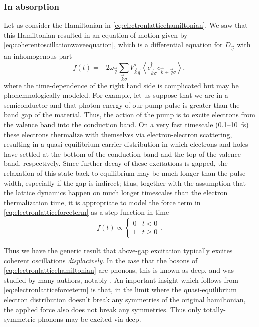 \subsubsection{In absorption}

Let us consider the Hamiltonian in \cref{eq:electronlatticehamiltonian}.
We saw that this Hamiltonian resulted in an equation of motion given by \cref{eq:coherentoscillationwaveequation}, which is a differential equation for $D_{\vec{q}}$ with an inhomogenous part
\begin{equation}\label{eq:electronlatticeforceterm}
f(t) = -2\omega_{\vec{q}}\sum_{\vec{k}\sigma}V^\sigma_{\vec{k}\vec{q}}\left<c^\dagger_{\vec{k}\sigma} c_{\vec{k}+\vec{q}\sigma}\right>,
\end{equation}
where the time-dependence of the right hand side is complicated but may be phonemnologically modeled.
For example, let us suppose that we are in a semiconductor and that photon energy of our pump pulse is greater than the band gap of the material.
Thus, the action of the pump is to excite electrons from the valence band into the conduction band.
On a very fast timescale (\num{0.1}--\qty{10}{fs}) these electrons thermalize with themselves via electron-electron scattering, resulting in a quasi-equilibrium carrier distribution in which electrons and holes have settled at the bottom of the conduction band and the top of the valence band, respectively.
Since further decay of these excitations is gapped, the relaxation of this state back to equilibrium may be much longer than the pulse width, especially if the gap is indirect; thus, together with the assumption that the lattice dynamics happen on much longer timescales than the electron thermalization time, it is appropriate to model the force term in \cref{eq:electronlatticeforceterm} as a step function in time
\begin{equation}
f(t) \propto \begin{cases} 0 & t<0\\1 & t\ge 0 \end{cases}.
\end{equation}

Thus we have the generic result that above-gap excitation typically excites coherent oscillations \emph{displacively}.
In the case that the bosons of \cref{eq:electronlatticehamiltonian} are phonons, this is known as \gls{decp}, and was studied by many authors, notably \citet{zeiger_theory_1992}.
An important insight which follows from \cref{eq:electronlatticeforceterm} is that, in the limit where the quasi-equilibrium electron distribution doesn't break any symmetries of the original hamiltonian, the applied force also does not break any symmetries.
Thus only totally-symmetric phonons may be excited via \gls{decp}.

